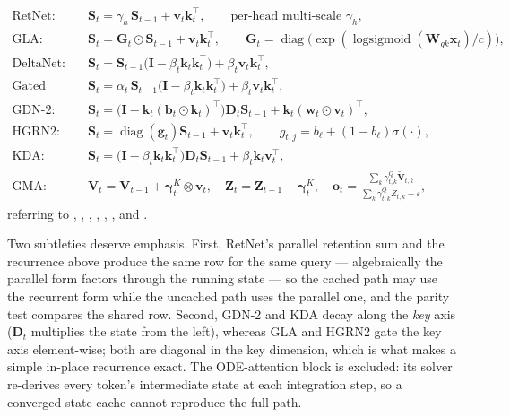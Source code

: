 \begin{align}
\text{RetNet:}\quad & \mathbf{S}_t = \gamma_h\,\mathbf{S}_{t-1} + \mathbf{v}_t\mathbf{k}_t^\top, \qquad \text{per-head multi-scale }\gamma_h, \\
\text{GLA:}\quad & \mathbf{S}_t = \mathbf{G}_t \odot \mathbf{S}_{t-1} + \mathbf{v}_t\mathbf{k}_t^\top, \qquad \mathbf{G}_t = \operatorname{diag}\big(\exp(\operatorname{logsigmoid}(\mathbf{W}_{gk}\mathbf{x}_t)/c)\big), \\
\text{DeltaNet:}\quad & \mathbf{S}_t = \mathbf{S}_{t-1}\big(\mathbf{I} - \beta_t\mathbf{k}_t\mathbf{k}_t^\top\big) + \beta_t\mathbf{v}_t\mathbf{k}_t^\top, \\
\text{Gated DeltaNet:}\quad & \mathbf{S}_t = \alpha_t\,\mathbf{S}_{t-1}\big(\mathbf{I} - \beta_t\mathbf{k}_t\mathbf{k}_t^\top\big) + \beta_t\mathbf{v}_t\mathbf{k}_t^\top, \\
\text{GDN-2:}\quad & \mathbf{S}_t = \big(\mathbf{I} - \mathbf{k}_t(\mathbf{b}_t\odot\mathbf{k}_t)^\top\big)\mathbf{D}_t\mathbf{S}_{t-1} + \mathbf{k}_t(\mathbf{w}_t\odot\mathbf{v}_t)^\top, \\
\text{HGRN2:}\quad & \mathbf{S}_t = \operatorname{diag}(\mathbf{g}_t)\mathbf{S}_{t-1} + \mathbf{v}_t\mathbf{k}_t^\top, \qquad g_{t,j} = b_\ell + (1-b_\ell)\sigma(\cdot), \\
\text{KDA:}\quad & \mathbf{S}_t = \big(\mathbf{I} - \beta_t\mathbf{k}_t\mathbf{k}_t^\top\big)\mathbf{D}_t\mathbf{S}_{t-1} + \beta_t\mathbf{k}_t\mathbf{v}_t^\top, \\
\text{GMA:}\quad & \tilde{\mathbf{V}}_t = \tilde{\mathbf{V}}_{t-1} + \boldsymbol{\gamma}^{K}_t \otimes \mathbf{v}_t,\quad \mathbf{Z}_t = \mathbf{Z}_{t-1} + \boldsymbol{\gamma}^{K}_t, \quad \mathbf{o}_t = \frac{\sum_k \gamma^{Q}_{t,k}\tilde{\mathbf{V}}_{t,k}}{\sum_k \gamma^{Q}_{t,k}Z_{t,k} + \varepsilon},
\end{align}
referring to \citet{sun_retentive_2023}, \citet{yang_gla_2023}, \citet{yang_deltanet_2024}, \citet{yang_gated_deltanet_2024}, \citet{hatamizadeh_gated_deltanet2_2026}, \citet{qin_hgrn2_2024}, \citet{kimi_kda_2025} and \citet{huang_gma_2026}.

Two subtleties deserve emphasis. First, RetNet's parallel retention sum and the recurrence above produce the same row for the same query --- algebraically the parallel form factors through the running state --- so the cached path may use the recurrent form while the uncached path uses the parallel one, and the parity test compares the shared row. Second, GDN-2 and KDA decay along the \emph{key} axis ($\mathbf{D}_t$ multiplies the state from the left), whereas GLA and HGRN2 gate the key axis element-wise; both are diagonal in the key dimension, which is what makes a simple in-place recurrence exact. The ODE-attention block is excluded: its solver re-derives every token's intermediate state at each integration step, so a converged-state cache cannot reproduce the full path.

